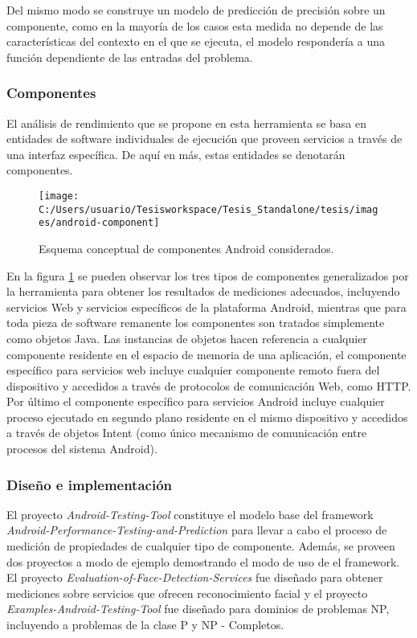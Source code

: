 Del mismo modo se construye un modelo de predicción de precisión sobre
un componente, como en la mayoría de los casos esta medida no depende
de las características del contexto en el que se ejecuta, el modelo
respondería a una función dependiente de las entradas del problema.


\subsubsection*{Componentes}

El análisis de rendimiento que se propone en esta herramienta se basa
en entidades de software individuales de ejecución que proveen servicios
a través de una interfaz específica. De aquí en más, estas entidades
se denotarán componentes. 

\begin{figure}
\begin{centering}
\texttt{[image: C:/Users/usuario/Tesisworkspace/Tesis\_Standalone/tesis/images/android-component]}
\par\end{centering}

\caption{Esquema conceptual de componentes Android considerados. \label{fig:android-component}}
\end{figure}


En la figura \ref{fig:android-component} se pueden observar los tres
tipos de componentes generalizados por la herramienta para obtener
los resultados de mediciones adecuados, incluyendo servicios Web y
servicios específicos de la plataforma Android, mientras que para
toda pieza de software remanente los componentes son tratados simplemente
como objetos Java. Las instancias de objetos hacen referencia a cualquier
componente residente en el espacio de memoria de una aplicación, el
componente específico para servicios web incluye cualquier componente
remoto fuera del dispositivo y accedidos a través de protocolos de
comunicación Web, como \ac{HTTP}. Por último el componente específico
para servicios Android incluye cualquier proceso ejecutado en segundo
plano residente en el mismo dispositivo y accedidos a través de objetos
Intent (como único mecanismo de comunicación entre procesos del sistema
Android). 


\subsubsection*{Diseño e implementación}

El proyecto \emph{Android-Testing-Tool} constituye el modelo base
del framework \emph{Android-Performance-Testing-and-Prediction} para
llevar a cabo el proceso de medición de propiedades de cualquier tipo
de componente. Además, se proveen dos proyectos a modo de ejemplo
demostrando el modo de uso de el framework. El proyecto \emph{Evaluation-of-Face-Detection-Services}
fue diseñado para obtener mediciones sobre servicios que ofrecen reconocimiento
facial y el proyecto \emph{Examples-Android-Testing-Tool} fue diseñado
para dominios de problemas NP, incluyendo a problemas de la clase
P y NP - Completos. 

